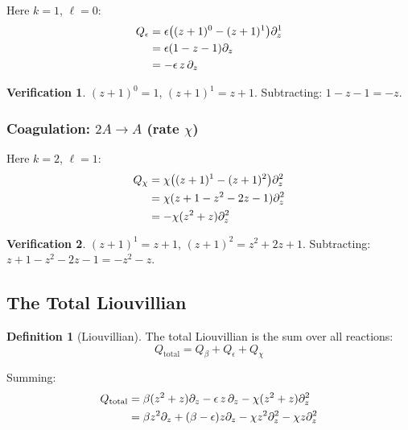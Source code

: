 \documentclass[11pt,a4paper]{article}
\theoremstyle{definition}
\newtheorem{definition}[theorem]{Definition}
\newtheorem*{verification}{Verification}
\begin{document}
Here $k=1$, $\ell=0$:
\begin{align}
Q_\epsilon &= \epsilon \bigl((z+1)^0 - (z+1)^1\bigr) \partial_z^1 \notag \\
           &= \epsilon (1 - z - 1) \partial_z \notag \\
           &= -\epsilon\, z\, \partial_z
\label{eq:Q_eps}
\end{align}

\begin{verification}
$(z{+}1)^0 = 1$, $(z{+}1)^1 = z+1$.
Subtracting: $1 - z - 1 = -z$. \checkmark
\end{verification}

\subsubsection{Coagulation: $2A \to A$ (rate $\chi$)}

Here $k=2$, $\ell=1$:
\begin{align}
Q_\chi &= \chi \bigl((z+1)^1 - (z+1)^2\bigr) \partial_z^2 \notag \\
       &= \chi (z + 1 - z^2 - 2z - 1) \partial_z^2 \notag \\
       &= -\chi (z^2 + z) \partial_z^2
\label{eq:Q_chi}
\end{align}

\begin{verification}
$(z{+}1)^1 = z+1$, $(z{+}1)^2 = z^2 + 2z + 1$.
Subtracting: $z + 1 - z^2 - 2z - 1 = -z^2 - z$. \checkmark
\end{verification}

\subsection{The Total Liouvillian}

\begin{definition}[Liouvillian]
The total Liouvillian is the sum over all reactions:
\begin{equation}
Q_{\mathrm{total}} = Q_\beta + Q_\epsilon + Q_\chi
\end{equation}
\end{definition}

Summing:
\begin{align}
Q_{\mathrm{total}} &= \beta(z^2 + z)\partial_z - \epsilon\, z\, \partial_z - \chi(z^2 + z)\partial_z^2 \notag \\
&= \beta z^2 \partial_z + (\beta - \epsilon) z \partial_z - \chi z^2 \partial_z^2 - \chi z \partial_z^2
\label{eq:Q_total}
\end{align}
\end{document}
